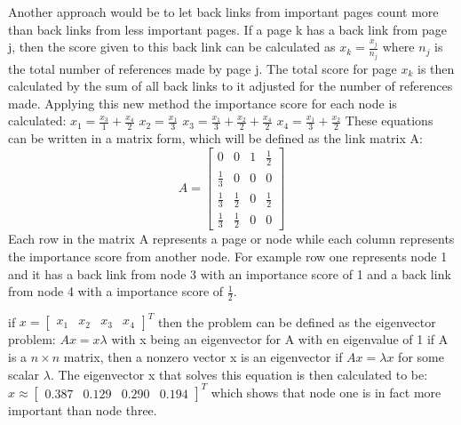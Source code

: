 Another approach would be to let back links from important pages count more than back links from less important pages. If a page k has a back link from page j, then the score given to this back link can be calculated as $x_{k} = \frac{x_{j}}{n_{j}}$ where $n_{j}$ is the total number of references made by page j. The total score for page $x_{k}$ is then calculated by the sum of all back links to it adjusted for the number of references made. Applying this new method the importance score for each node is calculated:
\newline $x_{1} = \frac{x_{3}}{1} + \frac{x_{4}}{2} $ 
\newline $x_{2} = \frac{x_{1}}{3} $
\newline $x_{3} = \frac{x_{1}}{3} + \frac{x_{2}}{2} + \frac{x_{4}}{2} $
\newline $x_{4} = \frac{x_{1}}{3} + \frac{x_{2}}{2} $
\newline These equations can be written in a matrix form, which will be defined as the link matrix A:
\newline 
\[A=\begin{bmatrix}
0           & 0           & 1 & \frac{1}{2} \\
\frac{1}{3} & 0           & 0 & 0           \\
\frac{1}{3} & \frac{1}{2} & 0 & \frac{1}{2} \\
\frac{1}{3} & \frac{1}{2} & 0 & 0
\end{bmatrix}\]
\newline Each row in the matrix A represents a page or node while each column  represents the importance score from another node. For example row one represents node 1 and it has a back link from node 3 with an importance score of 1 and a back link from node 4 with a importance score of $\frac{1}{2}$.\par

if $x = \begin{bmatrix} x_{1} & x_{2} & x_{3} & x_{4} \end{bmatrix} ^{T}$ then the problem can be defined as the eigenvector problem:
\newline $Ax = x \lambda$ 
\newline with x being an eigenvector for A with en eigenvalue of 1
\newline if A is a $n\times n$ matrix, then a nonzero vector x is an eigenvector if $Ax = \lambda x$ for some scalar $\lambda$. The eigenvector x that solves this equation is then calculated to be:
\newline $x \approx \begin{bmatrix} 0.387 & 0.129 & 0.290 & 0.194\end{bmatrix}^{T}$
which shows that node one is in fact more important than node three.\par

